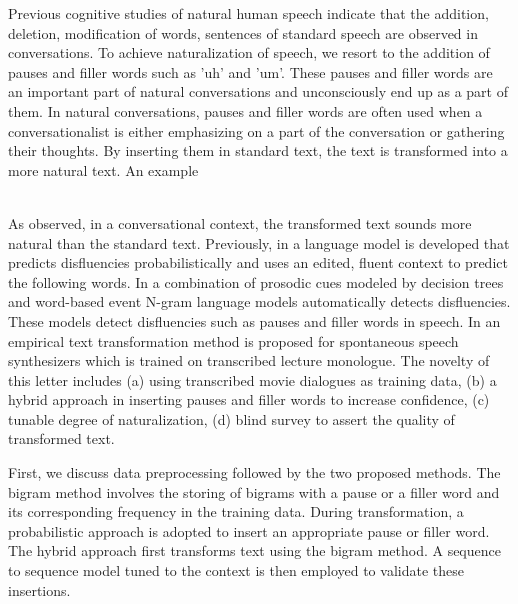 \documentclass[journal]{IEEEtran}
\begin{document}
Previous cognitive studies of natural human speech indicate that the addition, deletion, modification of words, sentences of standard speech are observed in conversations. To achieve naturalization of speech, we resort to the addition of pauses and filler words such as 'uh' and 'um'. These pauses and filler words are an important part of natural conversations and unconsciously end up as a part of them. In natural conversations, pauses and filler words are often used when a conversationalist is either emphasizing on a part of the conversation or gathering their thoughts. By inserting them in standard text, the text is transformed into a more natural text. An example

\noindent{}
\\

As observed, in a conversational context, the transformed text sounds more natural than the standard text. Previously, in \cite{stolcke1} a language model is developed that predicts disfluencies probabilistically and uses an edited, fluent context to predict the following words. In \cite{stolcke2} a combination of prosodic cues modeled by decision trees and word-based event N-gram language models automatically detects disfluencies. These models detect disfluencies such as pauses and filler words in speech. In \cite{sundaram} an empirical text transformation method is proposed for spontaneous speech synthesizers which is trained on transcribed lecture monologue. The novelty of this letter includes (a) using transcribed movie dialogues as training data, (b) a hybrid approach in inserting pauses and filler words to increase confidence, (c) tunable degree of naturalization, (d) blind survey to assert the quality of transformed text.

First, we discuss data preprocessing followed by the two proposed methods. The bigram method involves the storing of bigrams with a pause or a filler word and its corresponding frequency in the training data. During transformation, a probabilistic approach is adopted to insert an appropriate pause or filler word. The hybrid approach first transforms text using the bigram method. A sequence to sequence model tuned to the context is then employed to validate these insertions.
\end{document}
